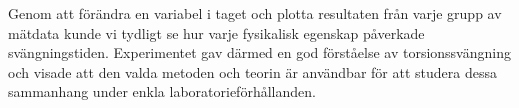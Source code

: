 \documentclass[a4paper]{article}
\begin{document}
Genom att förändra en variabel i taget och plotta resultaten från varje grupp av mätdata kunde vi tydligt se hur varje fysikalisk egenskap påverkade svängningstiden. Experimentet gav därmed en god förståelse av torsionssvängning och visade att den valda metoden och teorin är användbar för att studera dessa sammanhang under enkla laboratorieförhållanden.

\newpage
\printbibliography %

%
% 
\end{document}
